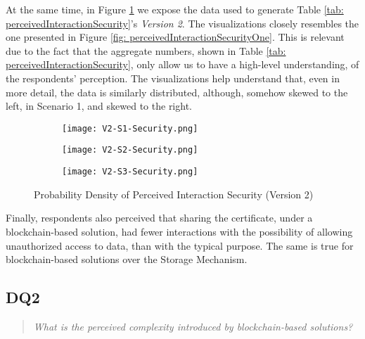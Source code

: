 At the same time, in Figure \ref{fig: perceivedInteractionSecurityTwo} we expose the data used to generate Table \ref{tab: perceivedInteractionSecurity}'s \textit{Version 2}. The visualizations closely resembles the one presented in Figure \ref{fig: perceivedInteractionSecurityOne}. This is relevant due to the fact that the aggregate numbers, shown in Table \ref{tab: perceivedInteractionSecurity}, only allow us to have a high-level understanding, of the respondents' perception. The visualizations help understand that, even in more detail, the data is similarly distributed, although, somehow skewed to the left, in Scenario 1, and skewed to the right.

\begin{figure}[htb]
	\centering
	\begin{subfigure}[b]{0.49\textwidth}
		\centering
		\texttt{[image: V2-S1-Security.png]}
	\end{subfigure}
	\begin{subfigure}[b]{0.49\textwidth}
		\centering
		\texttt{[image: V2-S2-Security.png]}
	\end{subfigure}
	\hfill
	\begin{subfigure}[b]{0.49\textwidth}
		\centering
		\texttt{[image: V2-S3-Security.png]}
	\end{subfigure}

	\caption{Probability Density of Perceived Interaction Security (Version 2)}
	\label{fig: perceivedInteractionSecurityTwo}
\end{figure}

Finally, respondents also perceived that sharing the certificate, under a blockchain-based solution, had fewer interactions with the possibility of allowing unauthorized access to data, than with the typical purpose. The same is true for blockchain-based solutions over the Storage Mechanism.

\subsection{DQ2}

\begin{quote}
	\textit{What is the perceived complexity introduced by blockchain-based solutions?}
\end{quote}

